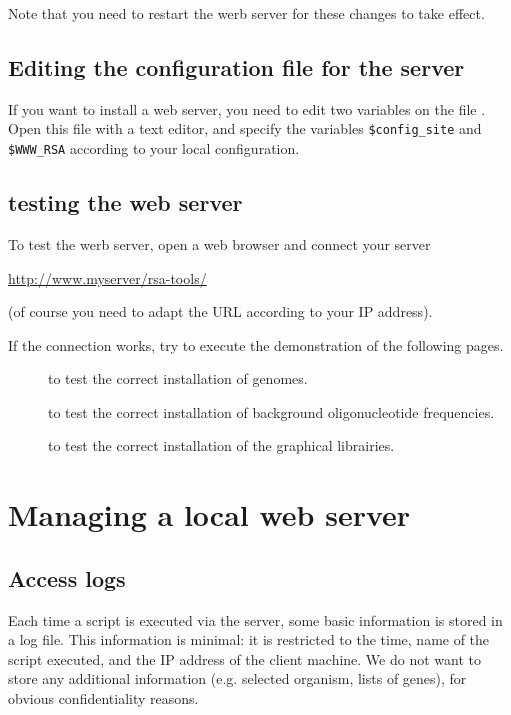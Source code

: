 \documentclass{article}
\begin{document}
Note that you need to restart the werb server for these changes to
take effect.

\subsection{Editing the configuration file for the \RSAT server}

If you want to install a web server, you need to edit two variables on
the file . Open this file with a text editor, and
specify the variables \texttt{\$config\_site} and \texttt{\$WWW\_RSA}
according to your local configuration.


\subsection{testing the web server}

To test the werb server, open a web browser and connect your \RSAT server

\url{http://www.myserver/rsa-tools/} 

(of course you  need to adapt the URL according to your IP address).

If the connection works, try to execute the demonstration of the
following pages.

\begin{description}
\item[] to test the correct installation of genomes. 

\item[] to test the correct installation of
background oligonucleotide frequencies.

\item[] to test the correct installation of the
graphical librairies.

\end{description}

\section{Managing a local web server}

\subsection{Access logs}

Each time a script is executed via the \RSAT server, some basic
information is stored in a log file. This information is minimal: it
is restricted to the time, name of the script executed, and the IP
address of the client machine. We do not want to store any additional
information (e.g. selected organism, lists of genes), for obvious
confidentiality reasons.
\end{document}
